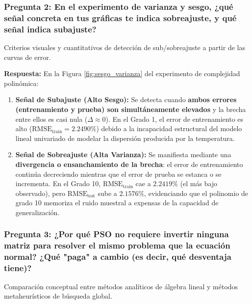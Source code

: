 \documentclass[12pt,a4paper]{article}
\begin{document}
\vspace{10pt}
\subsubsection*{Pregunta 2: En el experimento de varianza y sesgo, ¿qué señal concreta en tus gráficas te indica sobreajuste, y qué señal indica subajuste?}
\begin{pthreeProblem}
Criterios visuales y cuantitativos de detección de sub/sobreajuste a partir de las curvas de error.
\end{pthreeProblem}

\textbf{Respuesta:}
En la Figura \ref{fig:sesgo_varianza} del experimento de complejidad polinómica:
\begin{enumerate}[label={\color{p3blue}$\blacktriangleright$}]
  \item \textbf{Señal de Subajuste (Alto Sesgo):} Se detecta cuando \textbf{ambos errores (entrenamiento y prueba) son simultáneamente elevados} y la brecha entre ellos es casi nula ($\Delta \approx 0$). En el Grado 1, el error de entrenamiento es alto ($\text{RMSE}_{\text{train}} = 2.2490\%$) debido a la incapacidad estructural del modelo lineal univariado de modelar la dispersión producida por la temperatura.
  \item \textbf{Señal de Sobreajuste (Alta Varianza):} Se manifiesta mediante una \textbf{divergencia o ensanchamiento de la brecha}: el error de entrenamiento continúa decreciendo mientras que el error de prueba se estanca o se incrementa. En el Grado 10, $\text{RMSE}_{\text{train}}$ cae a $2.2419\%$ (el más bajo observado), pero $\text{RMSE}_{\text{test}}$ sube a $2.1576\%$, evidenciando que el polinomio de grado 10 memoriza el ruido muestral a expensas de la capacidad de generalización.
\end{enumerate}

\vspace{10pt}
\subsubsection*{Pregunta 3: ¿Por qué PSO no requiere invertir ninguna matriz para resolver el mismo problema que la ecuación normal? ¿Qué "paga" a cambio (es decir, qué desventaja tiene)?}
\begin{pthreeProblem}
Comparación conceptual entre métodos analíticos de álgebra lineal y métodos metaheurísticos de búsqueda global.
\end{pthreeProblem}
\end{document}
